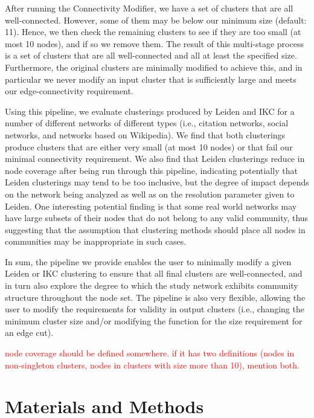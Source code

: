 \documentclass[a4paper]{article}   	%
\begin{document}
After running the Connectivity Modifier, we have a set of clusters that are all well-connected. However, some of them may be below our minimum size (default: 11).
Hence, we then check the remaining clusters to see if they are too small (at most 10 nodes), and if so we remove them.
The result of this multi-stage process is a set of clusters that are all well-connected and all at least the specified size.
Furthermore, the original clusters are minimally modified to achieve this, and in particular we never modify an input cluster that is sufficiently large
and meets our edge-connectivity requirement.

Using this pipeline, we evaluate clusterings produced by Leiden and IKC for a number of different networks of different types (i.e., citation networks, social networks, and networks based
on Wikipedia).
We find that both clusterings produce clusters that are either very small (at most 10 nodes) or that fail our minimal connectivity requirement.
We also find that Leiden clusterings reduce in node coverage after being run through this pipeline, indicating  potentially that Leiden clusterings may tend to be too inclusive, but
the degree of impact depends on the network being analyzed as well as on the resolution parameter given to Leiden.
One interesting potential finding is that some real world networks may have large subsets of their nodes that do not belong to any valid community,
thus suggesting that the assumption that clustering methods should place all nodes in communities  may be inappropriate in such cases.

In sum, the pipeline we provide enables the user to minimally modify a given Leiden or IKC clustering to ensure that all final clusters are well-connected,
and in turn also explore the degree to which the study network exhibits community structure throughout the node set.
The pipeline is also very flexible, allowing the user to modify the requirements for validity in output clusters (i.e., changing the minimum cluster size and/or modifying the function for the
size requirement for an edge cut).

\textcolor{red}{node coverage should be defined somewhere. if it has two definitions (nodes in non-singleton clusters, nodes in clusters with size more than 10), mention both. }

\section{Materials and Methods}
\end{document}
